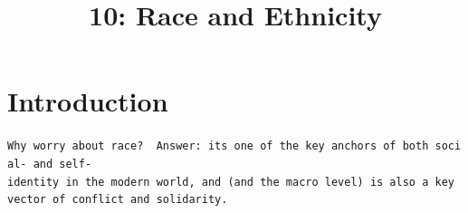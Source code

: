 \documentclass[
  letterpaper,
  DIV=11,
  numbers=noendperiod,
  oneside]{scrartcl}
\title{10: Race and Ethnicity}
\author{}
\date{}
\begin{document}
\maketitle


\section{Introduction}\label{introduction}

\texttt{Why\ worry\ about\ race?\ \ Answer:\ it\textquotesingle{}s\ one\ of\ the\ key\ anchors\ of\ both\ social-\ and\ self-identity\ in\ the\ modern\ world,\ and\ (and\ the\ macro\ level)\ is\ also\ a\ key\ vector\ of\ conflict\ and\ solidarity.}
\end{document}

